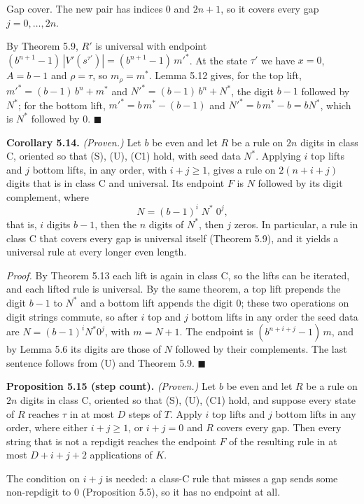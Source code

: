 \documentclass[11pt,letterpaper]{article}
\theoremstyle{paperstyle}
\theoremstyle{paperstyledef}
\theoremstyle{paperstylerem}
\begin{document}
Gap cover. The new pair has indices \(0\) and \(2n+1\), so it covers every gap \(j = 0, \dots, 2n\).

By Theorem 5.9, \(R'\) is universal with endpoint \((b^{n+1}-1)\,|V'(s^{\tau'})| = (b^{n+1}-1)\, m'^*\). At the state \(\tau'\) we have \(x = 0\), \(A = b-1\) and \(\rho = \tau\), so \(m_\rho = m^*\). Lemma 5.12 gives, for the top lift, \(m'^* = (b-1)\,b^n + m^*\) and \(N'^* = (b-1)\,b^n + N^*\), the digit \(b-1\) followed by \(N^*\); for the bottom lift, \(m'^* = b\, m^* - (b-1)\) and \(N'^* = b\,m^* - b = b N^*\), which is \(N^*\) followed by \(0\). \(\blacksquare\)

\textbf{Corollary 5.14.} \emph{(Proven.)} Let \(b\) be even and let \(R\) be a rule on \(2n\) digits in class C, oriented so that (S), (U), (C1) hold, with seed data \(N^*\). Applying \(i\) top lifts and \(j\) bottom lifts, in any order, with \(i + j \ge 1\), gives a rule on \(2(n+i+j)\) digits that is in class C and universal. Its endpoint \(F\) is \(N\) followed by its digit complement, where \[N = (b-1)^i \; N^* \; 0^j,\] that is, \(i\) digits \(b-1\), then the \(n\) digits of \(N^*\), then \(j\) zeros. In particular, a rule in class C that covers every gap is universal itself (Theorem 5.9), and it yields a universal rule at every longer even length.

\emph{Proof.} By Theorem 5.13 each lift is again in class C, so the lifts can be iterated, and each lifted rule is universal. By the same theorem, a top lift prepends the digit \(b-1\) to \(N^*\) and a bottom lift appends the digit \(0\); these two operations on digit strings commute, so after \(i\) top and \(j\) bottom lifts in any order the seed data are \(N = (b-1)^i N^* 0^j\), with \(m = N + 1\). The endpoint is \((b^{n+i+j} - 1)\, m\), and by Lemma 5.6 its digits are those of \(N\) followed by their complements. The last sentence follows from (U) and Theorem 5.9. \(\blacksquare\)

\textbf{Proposition 5.15 (step count).} \emph{(Proven.)} Let \(b\) be even and let \(R\) be a rule on \(2n\) digits in class C, oriented so that (S), (U), (C1) hold, and suppose every state of \(R\) reaches \(\tau\) in at most \(D\) steps of \(T\). Apply \(i\) top lifts and \(j\) bottom lifts in any order, where either \(i + j \ge 1\), or \(i + j = 0\) and \(R\) covers every gap. Then every string that is not a repdigit reaches the endpoint \(F\) of the resulting rule in at most \(D + i + j + 2\) applications of \(K\).

The condition on \(i + j\) is needed: a class-C rule that misses a gap sends some non-repdigit to \(0\) (Proposition 5.5), so it has no endpoint at all.
\end{document}
